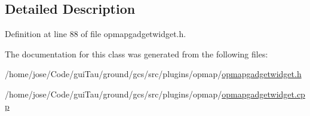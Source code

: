 \subsection{Detailed Description}


Definition at line 88 of file opmapgadgetwidget.\-h.



The documentation for this class was generated from the following files\-:\begin{DoxyCompactItemize}
\item 
/home/jose/\-Code/gui\-Tau/ground/gcs/src/plugins/opmap/\hyperlink{opmapgadgetwidget_8h}{opmapgadgetwidget.\-h}\item 
/home/jose/\-Code/gui\-Tau/ground/gcs/src/plugins/opmap/\hyperlink{opmapgadgetwidget_8cpp}{opmapgadgetwidget.\-cpp}\end{DoxyCompactItemize}
